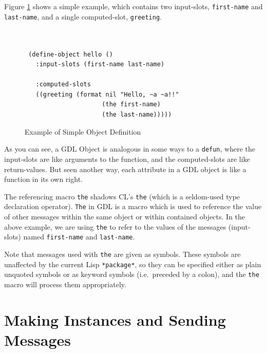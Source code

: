 \documentclass [11pt]{book}
\begin{document}
Figure 
\ref{fig:object-hello} shows a simple example, which contains two input-slots, \texttt{first-name} and \texttt{last-name}, and a single computed-slot, \texttt{greeting}.
\begin{figure}
\begin{lrbox}{\boxedverb}
\begin{minipage}{\linewidth}

\begin{verbatim}


 (define-object hello ()
   :input-slots (first-name last-name)

   :computed-slots 
   ((greeting (format nil "Hello, ~a ~a!!" 
                     (the first-name) 
                     (the last-name)))))

\end{verbatim}
\end{minipage}
\end{lrbox}
\fbox{\usebox{\boxedverb}}

\caption{Example of Simple Object Definition}

\label{fig:object-hello}

\end{figure}
As you can see, a GDL Object is analogous in some ways to a \texttt{defun}, where the input-slots are like arguments to the function, and the computed-slots
are like return-values. But seen another way, each attribute in a GDL object is like a function in its own right.

The referencing macro \texttt{the} shadows CL's \texttt{the} (which is a seldom-used type declaration operator). \texttt{The} in GDL is a macro which is used to reference the value of other messages 
within the same object or within contained objects. In the above example, we are using \texttt{the} to refer to the values of the messages (input-slots) named \texttt{first-name} and \texttt{last-name}. 

Note that messages used with \texttt{the} are given as symbols. These symbols are unaffected by the current Lisp \texttt{*package*}, so they can be specified either as plain unquoted symbols or as keyword
symbols (i.e.\ preceded by a colon), and the \texttt{the} macro will process them appropriately.

\section{Making Instances and Sending Messages}

\label{sec:makinginstancesandsendingmessages}
\end{document}
